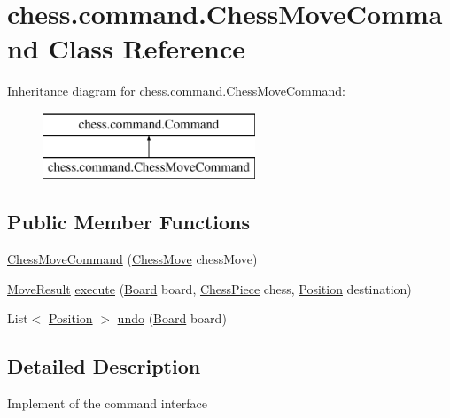 \hypertarget{classchess_1_1command_1_1_chess_move_command}{}\section{chess.\+command.\+Chess\+Move\+Command Class Reference}
\label{classchess_1_1command_1_1_chess_move_command}
Inheritance diagram for chess.\+command.\+Chess\+Move\+Command\+:\begin{figure}[H]
\begin{center}
\leavevmode
\includegraphics[height=2.000000cm]{classchess_1_1command_1_1_chess_move_command}
\end{center}
\end{figure}
\subsection*{Public Member Functions}
\begin{DoxyCompactItemize}
\item 
\mbox{\hyperlink{classchess_1_1command_1_1_chess_move_command_a015eb289219c05fd0ee4009d939b25bc}{Chess\+Move\+Command}} (\mbox{\hyperlink{classchess_1_1command_1_1_chess_move}{Chess\+Move}} chess\+Move)
\item 
\mbox{\hyperlink{enumchess_1_1models_1_1enums_1_1_move_result}{Move\+Result}} \mbox{\hyperlink{classchess_1_1command_1_1_chess_move_command_a7a74fa700b53038f06de08a11699d37e}{execute}} (\mbox{\hyperlink{classchess_1_1models_1_1_board}{Board}} board, \mbox{\hyperlink{classchess_1_1models_1_1_chess_piece}{Chess\+Piece}} chess, \mbox{\hyperlink{classchess_1_1models_1_1_position}{Position}} destination)
\item 
List$<$ \mbox{\hyperlink{classchess_1_1models_1_1_position}{Position}} $>$ \mbox{\hyperlink{classchess_1_1command_1_1_chess_move_command_a31a0cc0d4b19d5441f9420e0d4c1a795}{undo}} (\mbox{\hyperlink{classchess_1_1models_1_1_board}{Board}} board)
\end{DoxyCompactItemize}


\subsection{Detailed Description}
Implement of the command interface 

